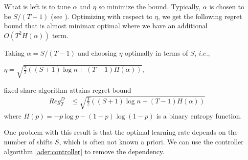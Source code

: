 \documentclass[12pt, a4paper]{report}
\begin{document}
What is left is to tune $\alpha$ and $\eta$ so minimize the bound. Typically, $\alpha$ is chosen to be $S / (T - 1)$ (see \cite[Section~5.2]{CesaBianchi2006PredictionLA}). Optimizing with respect to $\eta$, we get the following regret bound that is almost minimax optimal where we have an additional $O(T^2H(\alpha))$ term.  
\begin{cor}\cite[Corollary 5.1]{CesaBianchi2006PredictionLA} \label{cor:fixed}
Taking $\alpha = S/(T - 1)$ and choosing $\eta$ optimally in terms of $S$, $i.e.,$
\begin{center}
    $\displaystyle \eta = \sqrt{\frac{2}{T}\left((S+1) \log n + (T-1) H(\alpha) \right)}$,
\end{center} fixed share algorithm attains regret bound
\begin{align*}
    Reg_T^D &\leq \sqrt{\frac{T}{2}\left((S+1)\log n + (T-1) H(\alpha) \right)}
\end{align*}
where $H(p) = -p\log p - (1-p) \log (1-p)$ is a binary entropy function.
\end{cor}
  
One problem with this result is that the optimal learning rate depends on the number of shifts $S$, which is often not known a priori. We can use the controller algorithm \ref{ader:controller} to remove the dependency.
\end{document}
